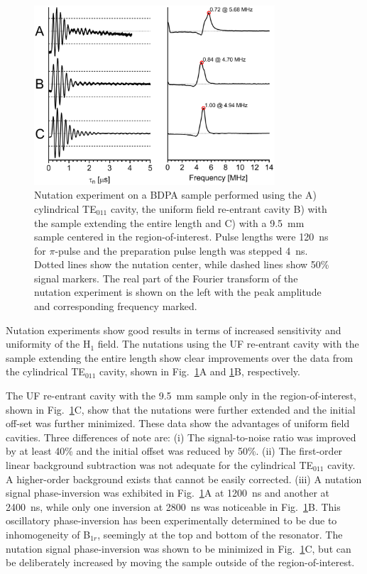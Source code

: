 \begin{figure}[htb]\centering
 \includegraphics[width=0.8\textwidth]{Kapitel/Ch2-Images/06a-Nutation.eps}
 \caption[Nutation experiment comparison.]{Nutation experiment on a BDPA sample performed using the A) cylindrical TE$_{011}$ cavity, the uniform field re-entrant \cylTE{} cavity B) with the sample extending the entire length and C) with a 9.5~mm sample centered in the region-of-interest. Pulse lengths were 120~ns for $\pi$-pulse and the preparation pulse length was stepped 4~ns. Dotted lines show the nutation center, while dashed lines show 50\% signal markers. The real part of the Fourier transform of the nutation experiment is shown on the left with the peak amplitude and corresponding frequency marked.}
 \label{Ch2-fig:nutation}
\end{figure}

Nutation experiments show good results in terms of increased sensitivity and uniformity of the H$_1$ field. The nutations using the UF re-entrant \cylTE{} cavity with the sample extending the entire length show clear improvements over the data from the cylindrical TE$_{011}$ cavity, shown in Fig.~\ref{Ch2-fig:nutation}A and \ref{Ch2-fig:nutation}B, respectively. 

The UF re-entrant \cylTE{} cavity with the 9.5~mm sample only in the region-of-interest, shown in Fig.~\ref{Ch2-fig:nutation}C, show that the nutations were further extended and the initial off-set was further minimized. These data show the advantages of uniform field cavities. Three differences of note are: (i) The signal-to-noise ratio was improved by at least 40\% and the initial offset was reduced by 50\%. (ii) The first-order linear background subtraction was not adequate for the cylindrical TE$_{011}$ cavity. A higher-order background exists that cannot be easily corrected. (iii) A nutation signal phase-inversion was exhibited in  Fig.~\ref{Ch2-fig:nutation}A at 1200~ns and another at 2400~ns, while only one inversion at 2800~ns was noticeable in Fig.~\ref{Ch2-fig:nutation}B. This oscillatory phase-inversion has been experimentally determined to be due to inhomogeneity of B$_{1r}$, seemingly at the top and bottom of the resonator. The nutation signal phase-inversion was shown to be minimized in Fig.~\ref{Ch2-fig:nutation}C, but can be deliberately increased by moving the sample outside of the region-of-interest.

